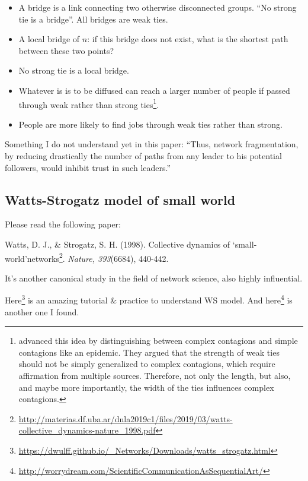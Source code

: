 \documentclass[
]{krantz}
\makeatletter
\renewcommand{\href}[2]{#2\footnote{\url{#1}}}
\newenvironment{kframe}{%
\medskip{}
\setlength{\fboxsep}{.8em}
 \def\at@end@of@kframe{}%
 \ifinner\ifhmode%
  \def\at@end@of@kframe{\end{minipage}}%
  \begin{minipage}{\columnwidth}%
 \fi\fi%
 \def\FrameCommand##1{\hskip\@totalleftmargin \hskip-\fboxsep
 \colorbox{shadecolor}{##1}\hskip-\fboxsep
     \hskip-\linewidth \hskip-\@totalleftmargin \hskip\columnwidth}%
 \MakeFramed {\advance\hsize-\width
   \@totalleftmargin\z@ \linewidth\hsize
   \@setminipage}}%
 {\par\unskip\endMakeFramed%
 \at@end@of@kframe}
\newenvironment{rmdblock}[1]
  {
  \begin{itemize}
  \renewcommand{\labelitemi}{
    \raisebox{-.7\height}[0pt][0pt]{
      {\setkeys{Gin}{width=3em,keepaspectratio}\texttt{[image: images/\#1]}}
    }
  }
  \setlength{\fboxsep}{1em}
  \begin{kframe}
  \item
  }
  {
  \end{kframe}
  \end{itemize}
  }
\newenvironment{rmdreminder}
  {\begin{rmdblock}{reminder}}
  {\end{rmdblock}}
\makeatother
\begin{document}
\begin{itemize}
\item
  A bridge is a link connecting two otherwise disconnected groups. ``No strong tie is a bridge''. All bridges are weak ties.
\item
  A local bridge of \(n\): if this bridge does not exist, what is the shortest path between these two points?
\item
  No strong tie is a local bridge.
\item
  Whatever is is to be diffused can reach a larger number of people if passed through weak rather than strong ties\footnote{\citet{centola2007complex} advanced this idea by distinguishing between complex contagions and simple contagions like an epidemic. They argued that the strength of weak ties should not be simply generalized to complex contagions, which require affirmation from multiple sources. Therefore, not only the length, but also, and maybe more importantly, the width of the ties influences complex contagions.}.
\item
  People are more likely to find jobs through weak ties rather than strong.
\end{itemize}

\begin{rmdreminder}
Something I do not understand yet in this paper:
``Thus, network fragmentation, by reducing drastically the number of paths from any leader to his potential followers, would inhibit trust in such leaders.''
\end{rmdreminder}

\hypertarget{watts-strogatz-model-of-small-world}{%
\subsection{Watts-Strogatz model of small world}\label{watts-strogatz-model-of-small-world}}

Please read the following paper:

Watts, D. J., \& Strogatz, S. H. (1998). \href{http://materias.df.uba.ar/dnla2019c1/files/2019/03/watts-collective_dynamics-nature_1998.pdf}{Collective dynamics of `small-world'networks}. \emph{Nature, 393}(6684), 440-442.

It's another canonical study in the field of network science, also highly influential.

\href{https://dwulff.github.io/_Networks/Downloads/watts_strogatz.html}{Here} is an amazing tutorial \& practice to understand WS model. And \href{http://worrydream.com/ScientificCommunicationAsSequentialArt/}{here} is another one I found.
\end{document}
